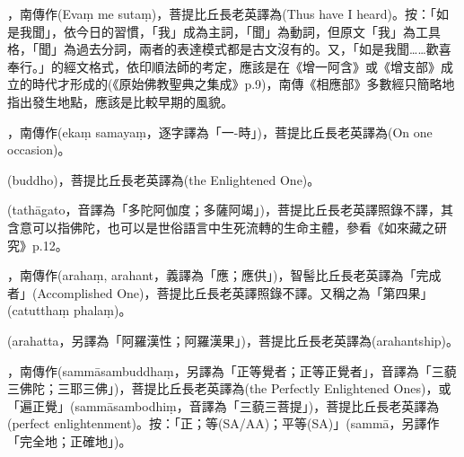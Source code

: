 \startitemgroup[noteitems]
\item{}，南傳作(Evaṃ me sutaṃ)，菩提比丘長老英譯為(Thus have I heard)。按：「如是我聞」，依今日的習慣，「我」成為主詞，「聞」為動詞，但原文「我」為工具格，「聞」為過去分詞，兩者的表達模式都是古文沒有的。又，「如是我聞……歡喜奉行。」的經文格式，依印順法師的考定，應該是在《增一阿含》或《增支部》成立的時代才形成的(《原始佛教聖典之集成》p.9)，南傳《相應部》多數經只簡略地指出發生地點，應該是比較早期的風貌。
\stopitemgroup

\startitemgroup[noteitems]
\item{}，南傳作(ekaṃ samayaṃ，逐字譯為「一-時」)，菩提比丘長老英譯為(On one occasion)。
\stopitemgroup

\startitemgroup[noteitems]
\item{}(buddho)，菩提比丘長老英譯為(the Enlightened One)。
\stopitemgroup

\startitemgroup[noteitems]
\item{}(tathāgato，音譯為「多陀阿伽度；多薩阿竭」)，菩提比丘長老英譯照錄不譯，其含意可以指佛陀，也可以是世俗語言中生死流轉的生命主體，參看《如來藏之研究》p.12。
\stopitemgroup

\startitemgroup[noteitems]
\item{}，南傳作(arahaṃ, arahant，義譯為「應；應供」)，智髻比丘長老英譯為「完成者」(Accomplished One)，菩提比丘長老英譯照錄不譯。又稱之為「第四果」(catutthaṃ phalaṃ)。
\item{}(arahatta，另譯為「阿羅漢性；阿羅漢果」)，菩提比丘長老英譯為(arahantship)。
\stopitemgroup

\startitemgroup[noteitems]
\item{}，南傳作(sammāsambuddhaṃ，另譯為「正等覺者；正等正覺者」，音譯為「三藐三佛陀；三耶三佛」)，菩提比丘長老英譯為(the Perfectly Enlightened Ones)，或「遍正覺」(sammāsambodhiṃ，音譯為「三藐三菩提」)，菩提比丘長老英譯為(perfect enlightenment)。按：「正；等(SA/AA)；平等(SA)」(sammā，另譯作「完全地；正確地」)。
\stopitemgroup

